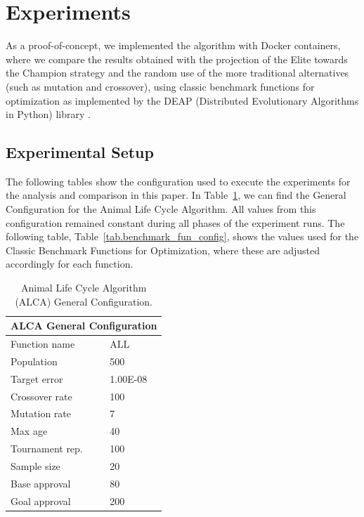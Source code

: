 \documentclass[graybox]{svmult}
\begin{document}
\section{Experiments}
\label{section.experiments}

As a proof-of-concept, we implemented the algorithm with Docker containers,
where we compare the results obtained with the projection of the Elite towards
the Champion strategy and the random use of the more traditional alternatives
(such as mutation and crossover), using classic benchmark functions for
optimization as implemented by the DEAP (Distributed Evolutionary Algorithms in
Python) library \cite{fortin2012deap}.

\subsection{Experimental Setup} 

The following tables show the configuration used to execute the experiments for
the analysis and comparison in this paper. In
Table~\ref{tab.general_configuration}, we can find the General Configuration
for the Animal Life Cycle Algorithm. All values from this configuration
remained constant during all phases of the experiment runs. The following
table, Table~\ref{tab.benchmark_fun_config}, shows the values used for the
Classic Benchmark Functions for Optimization, where these are adjusted
accordingly for each function.

\begin{table}[]
    \scriptsize
    \centering
    \caption{Animal Life Cycle Algorithm (ALCA) General Configuration.}\label{tab.general_configuration}
    \begin{tabular}{@{}ll@{}}
    \toprule
    \multicolumn{2}{l}{\textbf{ALCA General Configuration}} \\ \midrule
    Function name & ALL \\
    Population & 500 \\
    Target error & 1.00E-08 \\
    Crossover rate & 100 \\
    Mutation rate & 7 \\
    Max age & 40 \\
    Tournament rep. & 100 \\
    Sample size & 20 \\
    Base approval & 80 \\
    Goal approval & 200 \\ \bottomrule
    \end{tabular}
    \end{table}
\end{document}
